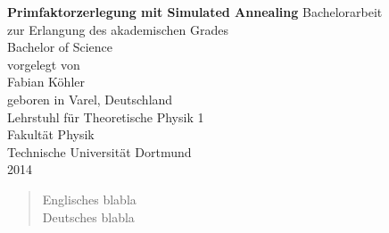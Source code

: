 \thispagestyle{empty}

\thispagestyle{empty}
\begin{center}
  \vspace*{\fill}
  \huge\textbf{Primfaktorzerlegung mit Simulated Annealing}
  \vfill
  \vfill
  \Large
  Bachelorarbeit \\
  zur Erlangung des akademischen Grades
  \\ Bachelor of Science \\[20pt]
  \normalsize
  vorgelegt von \\[5pt]
  {\Large Fabian Köhler} \\[5pt]
  geboren in Varel, Deutschland \\
  \vspace{20pt}
  Lehrstuhl für Theoretische Physik 1 \\
  Fakultät Physik \\
  Technische Universität Dortmund \\
  2014
\end{center}
\newpage

\thispagestyle{empty}
\begin{abstract}
  Englisches blabla\\
  Deutsches blabla
\end{abstract}
\newpage

\thispagestyle{empty}
\tableofcontents
\newpage

\setcounter{page}{1}
